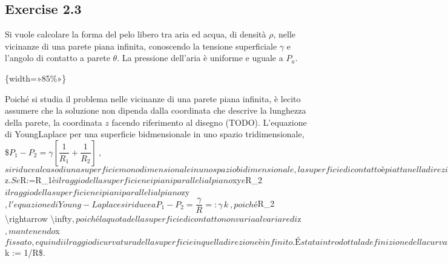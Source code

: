 \documentclass[letterpaper,10pt,italian]{jupyterBook}
\begin{document}
\sphinxstepscope


\subsection{Exercise 2.3}
\label{\detokenize{polimi/fluidmechanics-ita/template/capitoli/02_tensSup/0303in:exercise-2-3}}\label{\detokenize{polimi/fluidmechanics-ita/template/capitoli/02_tensSup/0303in:fluid-mechanics-surface-tension-ex-03}}\label{\detokenize{polimi/fluidmechanics-ita/template/capitoli/02_tensSup/0303in::doc}}
\sphinxAtStartPar
Si vuole calcolare la forma del pelo libero tra aria ed acqua, di
densità \(\rho\), nelle vicinanze di una parete piana infinita, conoscendo
la tensione superficiale \(\gamma\) e l’angolo di contatto a parete
\(\theta\). La pressione dell’aria è uniforme e uguale a \(P_a\).

\sphinxAtStartPar
{}\{width=»85\%»\}

\sphinxAtStartPar
Poiché si studia il problema nelle vicinanze di una parete piana
infinita, è lecito assumere che la soluzione non dipenda dalla
coordinata che descrive la lunghezza della parete, la coordinata \(z\)
facendo riferimento al disegno (TODO). L’equazione di Young\sphinxhyphen{}Laplace per
una superficie bidmensionale in uno spazio tridimensionale,
\$\(P_1 - P_2 = \gamma \left[ \dfrac{1}{R_1} + \dfrac{1}{R_2} \right] \ ,\)\(
si riduce al caso di una superficie monodimensionale in uno spazio
bidimensionale, la superficie di contatto è piatta nella direzione \)z\(.
Se \)R:=R\_1\( è il raggio della superficie nei piani paralleli al piano
\)x\sphinxhyphen{}y\( e \)R\_2\( il raggio della superficie nei piani paralleli al piano
\)z\sphinxhyphen{}y\(, l'equazione di Young-Laplace si riduce a
\)\(P_1 - P_2 = \dfrac{\gamma}{R} =: \gamma \, k  \ ,\)\( poiché
\)R\_2 \textbackslash{}rightarrow \textbackslash{}infty\(, poiché la quota della superficie di contatto
non varia al variare di \)z\(, mantenendo \)x\( fissato, e quindi il raggio
di curvatura della superficie in quella direzione è infinito. É stata
introdotta la definizione della curvatura \)k := 1/R\$.
\end{document}
